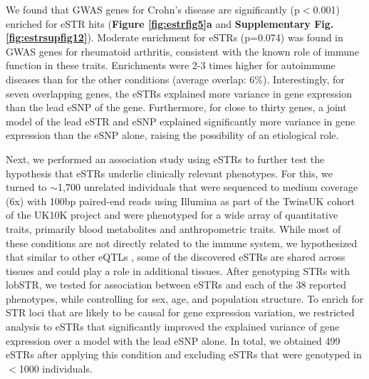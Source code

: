 We found that GWAS genes for Crohn's disease are significantly (p$<$0.001) enriched for eSTR hits (\textbf{Figure \ref{fig:estrfig5}a} and \textbf{Supplementary Fig. \ref{fig:estrsupfig12}}). Moderate enrichment for eSTRs (p=0.074) was found in GWAS genes for rheumatoid arthritis, consistent with the known role of immune function in these traits. Enrichments were 2-3 times higher for autoimmune diseases than for the other conditions (average overlap: 6\%). Interestingly, for seven overlapping genes, the eSTRs explained more variance in gene expression than the lead eSNP of the gene. Furthermore, for close to thirty genes, a joint model of the lead eSTR and eSNP explained significantly more variance in gene expression than the eSNP alone, raising the possibility of an etiological role. 

Next, we performed an association study using eSTRs to further test the hypothesis that eSTRs underlie clinically relevant phenotypes. For this, we turned to $\sim$1,700 unrelated individuals that were sequenced to medium coverage (6x) with 100bp paired-end reads using Illumina as part of the TwinsUK cohort of the UK10K project \cite{ConsortiumWalterMinEtAl2015} and were phenotyped for a wide array of quantitative traits, primarily blood metabolites and anthropometric traits. While most of these conditions are not directly related to the immune system, we hypothesized that similar to other eQTLs \cite{ArdlieDelucaSegreEtAl2015}, some of the discovered eSTRs are shared across tissues and could play a role in additional tissues. After genotyping STRs with lobSTR, we tested for association between eSTRs and each of the 38 reported phenotypes, while controlling for sex, age, and population structure. To enrich for STR loci that are likely to be causal for gene expression variation, we restricted analysis to eSTRs that significantly improved the explained variance of gene expression over a model with the lead eSNP alone. In total, we obtained 499 eSTRs after applying this condition and excluding eSTRs that were genotyped in $<$1000 individuals. 

